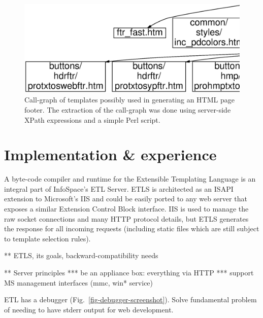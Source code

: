 \documentclass{www2003-submission}
\newcommand{\figref}[1]{Fig.~\ref{fig-#1}}
\begin{document}
\begin{figure}[bt]
\begin{centering}
\includegraphics[width=\linewidth]{ftr_fast-call-graph.eps}
\caption{Call-graph of templates possibly used in generating an HTML
page footer.  The extraction of the call-graph was done using
server-side XPath expressions and a simple Perl script. \label{fig-call-graph}}
\end{centering}
\end{figure}


\section{Implementation \& experience}
\label{sec-implementation}

A byte-code compiler and runtime for the Extensible Templating Language is
an integral part of InfoSpace's ETL Server.  ETLS is architected as an
ISAPI extension to Microsoft's IIS and could be easily ported to any
web server that exposes a similar Extension Control Block interface.
IIS is used to manage the raw socket connections and many HTTP
protocol details, but ETLS generates the response for all incoming
requests (including static files which are still subject to template
selection rules).

** ETLS, its goals, backward-compatibility needs

** Server principles
*** be an appliance box: everything via HTTP
*** support MS management interfaces (mmc, win* service)

ETL has a debugger (\figref{debugger-screenshot}).  Solve fundamental
problem of needing to have stderr output for web development.

\end{document}
